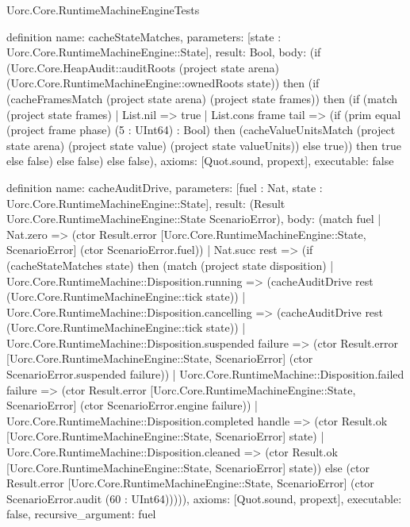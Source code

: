 \begin{lexlean}{Uorc.Core.RuntimeMachineEngineTests}
\begin{semanticmodule}
definition{
  name: cacheStateMatches,
  parameters: [state : Uorc.Core.RuntimeMachineEngine::State],
  result: Bool,
  body: (if (Uorc.Core.HeapAudit::auditRoots (project state arena) (Uorc.Core.RuntimeMachineEngine::ownedRoots state)) then (if (cacheFramesMatch (project state arena) (project state frames)) then (if (match (project state frames)
    | List.nil => true
    | List.cons frame tail => (if (prim equal (project frame phase) (5 : UInt64) : Bool) then (cacheValueUnitsMatch (project state arena) (project state value) (project state valueUnits)) else true)) then true else false) else false) else false),
  axioms: [Quot.sound, propext],
  executable: false
}

definition{
  name: cacheAuditDrive,
  parameters: [fuel : Nat, state : Uorc.Core.RuntimeMachineEngine::State],
  result: (Result Uorc.Core.RuntimeMachineEngine::State ScenarioError),
  body: (match fuel
    | Nat.zero => (ctor Result.error [Uorc.Core.RuntimeMachineEngine::State, ScenarioError] (ctor ScenarioError.fuel))
    | Nat.succ rest => (if (cacheStateMatches state) then (match (project state disposition)
      | Uorc.Core.RuntimeMachine::Disposition.running => (cacheAuditDrive rest (Uorc.Core.RuntimeMachineEngine::tick state))
      | Uorc.Core.RuntimeMachine::Disposition.cancelling => (cacheAuditDrive rest (Uorc.Core.RuntimeMachineEngine::tick state))
      | Uorc.Core.RuntimeMachine::Disposition.suspended failure => (ctor Result.error [Uorc.Core.RuntimeMachineEngine::State, ScenarioError] (ctor ScenarioError.suspended failure))
      | Uorc.Core.RuntimeMachine::Disposition.failed failure => (ctor Result.error [Uorc.Core.RuntimeMachineEngine::State, ScenarioError] (ctor ScenarioError.engine failure))
      | Uorc.Core.RuntimeMachine::Disposition.completed handle => (ctor Result.ok [Uorc.Core.RuntimeMachineEngine::State, ScenarioError] state)
      | Uorc.Core.RuntimeMachine::Disposition.cleaned => (ctor Result.ok [Uorc.Core.RuntimeMachineEngine::State, ScenarioError] state)) else (ctor Result.error [Uorc.Core.RuntimeMachineEngine::State, ScenarioError] (ctor ScenarioError.audit (60 : UInt64))))),
  axioms: [Quot.sound, propext],
  executable: false,
  recursive_argument: fuel
}


\end{semanticmodule}
\end{lexlean}
